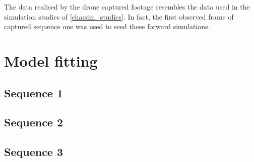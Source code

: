 The data realised by the drone captured footage resembles the data used in the
simulation studies of \cref{cha:sim_studies}. In fact, the first observed
frame of captured sequence one was used to seed these forward simulations.
    
\section{Model fitting}

\subsection{Sequence 1}

\subsection{Sequence 2}

\subsection{Sequence 3}





